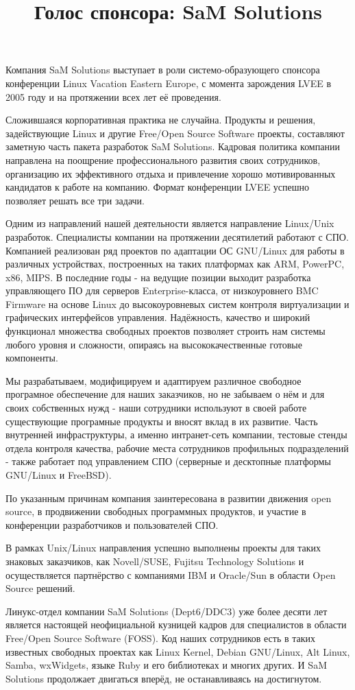 \documentclass[10pt, a5paper]{article}
\begin{document}
\title{Голос спонсора: SaM Solutions}
\date{}
\maketitle

Компания SaM Solutions выступает в роли системо-образующего спонсора конференции Linux Vacation Eastern Europe, с момента зарождения LVEE в 2005 году и на протяжении всех лет её проведения. 

Сложившаяся корпоративная практика не случайна. Продукты и решения, задействующие Linux и другие Free/Open Source Software проекты, составляют заметную часть пакета разработок SaM Solutions. Кадровая политика компании направлена на поощрение профессионального развития своих сотрудников, организацию их эффективного отдыха и привлечение хорошо мотивированных кандидатов к работе на компанию. Формат конференции LVEE успешно позволяет решать все три задачи. 

Одним из направлений нашей деятельности является направление Linux/Unix разработок. Специалисты компании на протяжении десятилетий работают с СПО. Компанией реализован ряд проектов по адаптации ОС GNU/Linux для работы в различных устройствах, построенных на таких платформах как ARM, PowerPC, x86, MIPS. В последние годы - на ведущие позиции выходит разработка управляющего ПО для серверов Enterprise-класса, от низкоуровнего BMC Firmware на основе Linux до высокоуровневых систем контроля виртуализации и графических интерфейсов управления. Надёжность, качество и широкий функционал множества свободных проектов позволяет строить нам системы любого уровня и сложности, опираясь на высококачественные готовые компоненты.

Мы разрабатываем, модифицируем и адаптируем различное свободное програмное обеспечение для наших заказчиков, но не забываем о нём и для своих собственных нужд - наши сотрудники используют в своей работе существующие програмные продукты и вносят вклад в их развитие. Часть внутренней инфраструктуры, а именно интранет-сеть компании, тестовые стенды отдела контроля качества, рабочие места сотрудников профильных подразделений - также работает под управлением СПО (серверные и десктопные платформы GNU/Linux и FreeBSD).

По указанным причинам компания заинтересована в развитии движения open source, в продвижении свободных программных продуктов, и участие в конференции разработчиков и пользователей СПО.

В рамках Unix/Linux направления успешно выполнены проекты для таких знаковых заказчиков, как  Novell/SUSE, Fujitsu Technology Solutions  и осуществляется партнёрство с компаниями IBM и Oracle/Sun в области Open Source решений.

Линукс-отдел компании SaM Solutions (Dept6/DDC3) уже более десяти лет является настоящей неофициальной кузницей кадров для специалистов в области Free/Open Source Software (FOSS). Код наших сотрудников есть в таких известных свободных проектах как Linux Kernel, Debian GNU/Linux, Alt Linux, Samba, wxWidgets, языке Ruby и его библиотеках и многих других. И SaM Solutions продолжает двигаться вперёд, не останавливаясь на достигнутом.
\end{document}

